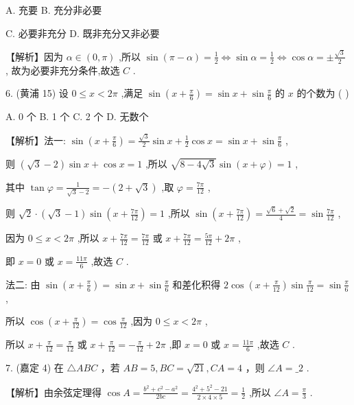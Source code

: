 \documentclass[10pt]{article}
\begin{document}
A. 充要 B. 充分非必要

C. 必要非充分 D. 既非充分又非必要

【解析】因为 \(\alpha  \in  \left( {0,\pi }\right)\) ,所以 \(\sin \left( {\pi  - \alpha }\right)  = \frac{1}{2} \Leftrightarrow  \sin \alpha  = \frac{1}{2} \Leftrightarrow  \cos \alpha  =  \pm  \frac{\sqrt{3}}{2}\) , 故为必要非充分条件,故选 \(C\) .

6. (黄浦 15) 设 \(0 \leq  x < {2\pi }\) ,满足 \(\sin \left( {x + \frac{\pi }{6}}\right)  = \sin x + \sin \frac{\pi }{6}\) 的 \(x\) 的个数为 ( )

A. 0 个 B. 1 个 C. 2 个 D. 无数个

【解析】法一: \(\sin \left( {x + \frac{\pi }{6}}\right)  = \frac{\sqrt{3}}{2}\sin x + \frac{1}{2}\cos x = \sin x + \sin \frac{\pi }{6}\) ,

则 \(\left( {\sqrt{3} - 2}\right) \sin x + \cos x = 1\) ,所以 \(\sqrt{8 - 4\sqrt{3}}\sin \left( {x + \varphi }\right)  = 1\) ,

其中 \(\tan \varphi  = \frac{1}{\sqrt{3} - 2} =  - \left( {2 + \sqrt{3}}\right)\) ,取 \(\varphi  = \frac{7\pi }{12}\) ,

则 \(\sqrt{2} \cdot  \left( {\sqrt{3} - 1}\right) \sin \left( {x + \frac{7\pi }{12}}\right)  = 1\) ,所以 \(\sin \left( {x + \frac{7\pi }{12}}\right)  = \frac{\sqrt{6} + \sqrt{2}}{4} = \sin \frac{7\pi }{12}\) ,

因为 \(0 \leq  x < {2\pi }\) ,所以 \(x + \frac{7\pi }{12} = \frac{7\pi }{12}\) 或 \(x + \frac{7\pi }{12} = \frac{5\pi }{12} + {2\pi }\) ,

即 \(x = 0\) 或 \(x = \frac{11\pi }{6}\) ,故选 \(C\) .

法二: 由 \(\sin \left( {x + \frac{\pi }{6}}\right)  = \sin x + \sin \frac{\pi }{6}\) 和差化积得 \(2\cos \left( {x + \frac{\pi }{12}}\right) \sin \frac{\pi }{12} = \sin \frac{\pi }{6}\) ,

所以 \(\cos \left( {x + \frac{\pi }{12}}\right)  = \cos \frac{\pi }{12}\) ,因为 \(0 \leq  x < {2\pi }\) ,

所以 \(x + \frac{\pi }{12} = \frac{\pi }{12}\) 或 \(x + \frac{\pi }{12} =  - \frac{\pi }{12} + {2\pi }\) ,即 \(x = 0\) 或 \(x = \frac{11\pi }{6}\) ,故选 \(C\) .

7. (嘉定 4) 在 \(\bigtriangleup  {ABC}\) ，若 \({AB} = 5,{BC} = \sqrt{21},{CA} = 4\) ，则 \({\angle A} = \_ 2\) .

【解析】由余弦定理得 \(\cos A = \frac{{b}^{2} + {c}^{2} - {a}^{2}}{2bc} = \frac{{4}^{2} + {5}^{2} - {21}}{2 \times  4 \times  5} = \frac{1}{2}\) ,所以 \(\angle A = \frac{\pi }{3}\) .
\end{document}
